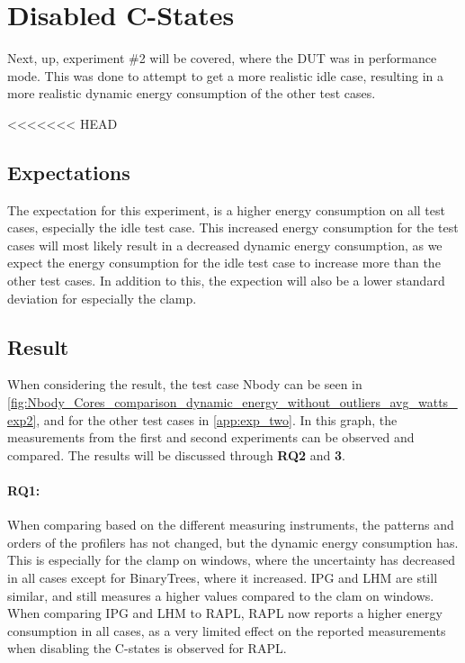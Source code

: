 \section{Disabled C-States}

Next, up, experiment \#2 will be covered, where the DUT was in performance mode. This was done to attempt to get a more realistic idle case, resulting in a more realistic dynamic energy consumption of the other test cases.

<<<<<<< HEAD
\subsection{Expectations} 

The expectation for this experiment, is a higher energy consumption on all test cases, especially the idle test case. This increased energy consumption for the test cases will most likely result in a decreased dynamic energy consumption, as we expect the energy consumption for the idle test case to increase more than the other test cases. In addition to this, the expection will also be a lower standard deviation for especially the clamp.

\subsection{Result} 
When considering the result, the test case Nbody can be seen in \cref{fig:Nbody_Cores_comparison_dynamic_energy_without_outliers_avg_watts_exp2}, and for the other test cases in \cref{app:exp_two}. In this graph, the measurements from the first and second experiments can be observed and compared. The results will be discussed through \textbf{RQ2} and \textbf{3}.

\paragraph*{RQ1:} When comparing based on the different measuring instruments, the patterns and orders of the profilers has not changed, but the dynamic energy consumption has. This is especially for the clamp on windows, where the uncertainty has decreased in all cases except for BinaryTrees, where it increased. IPG and LHM are still similar, and still measures a higher values compared to the clam on windows. When comparing IPG and LHM to RAPL, RAPL now reports a higher energy consumption in all cases, as a very limited effect on the reported measurements when disabling the C-states is observed for RAPL.

